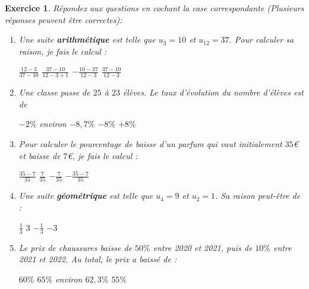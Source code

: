 \documentclass[11pt,a4paper]{exam}
\newtheorem{exo}{Exercice}
\begin{document}
\begin{exo}
    Répondez aux questions en cochant la case correspondante (Plusieurs réponses peuvent être correctes): 
    \begin{enumerate}
        \item Une suite \textbf{arithmétique} est telle que $u_3=10$ et $u_{12}=37$. Pour calculer sa raison, je fais le calcul : \newline
        \begin{oneparcheckboxes}
            \choice $\frac{12-3}{37-10}$
            \choice $\frac{37-10}{12-3+1}$
            \choice $-\frac{10-37}{12-3}$
            \choice $\frac{37-10}{12-3}$
        \end{oneparcheckboxes}
        \item Une classe passe de $25$ à $23$ élèves. Le taux d'évolution du nombre d'élèves est de \newline
        \begin{oneparcheckboxes}
            \choice $-2\%$
            \choice environ $-8{,}7\%$
            \choice $-8\%$
            \choice $+8\%$
        \end{oneparcheckboxes}
        \item Pour calculer le pourcentage de baisse d'un parfum qui vaut initialement $35$€ et baisse de $7$€, je fais le calcul : \newline
        \begin{oneparcheckboxes}
            \choice $\frac{35-7}{35}$
            \choice $\frac{7}{35}$
            \choice $-\frac{7}{35}$
            \choice $-\frac{35-7}{35}$
        \end{oneparcheckboxes}
        \item Une suite \textbf{géométrique} est telle que $u_{4}=9$ et $u_2=1$. Sa raison peut-être de : \newline
        \begin{oneparcheckboxes}
            \choice $\frac{1}{3}$
            \choice $3$
            \choice $-\frac{1}{3}$
            \choice $-3$
        \end{oneparcheckboxes}
        \item Le prix de chaussures baisse de $50\%$ entre 2020 et 2021, puis de $10\%$ entre 2021 et 2022. Au total, le prix a baissé de : \newline
        \begin{oneparcheckboxes}
            \choice $60\%$
            \choice $65\%$
            \choice environ $62{,}3\%$
            \choice $55\%$
        \end{oneparcheckboxes}
    \end{enumerate}
\end{exo}
\end{document}
